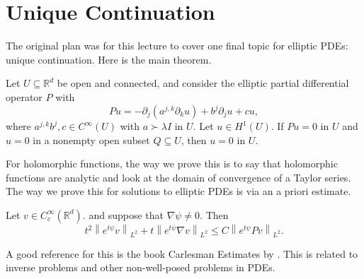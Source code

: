 \newpage
\section{Unique Continuation}
The original plan was for this lecture to cover one final topic for elliptic PDEs: unique continuation. Here is the main theorem. 


\begin{theorem}
[Aronszajn]
\label{thm: Aronszajn}
Let $U \subseteq \mathbb{R}^{d}$ be open and connected, and consider the elliptic partial differential operator $P$ with
$$
P u=-\partial_{j}\left(a^{j, k} \partial_{k} u\right)+b^{j} \partial_{j} u+c u,
$$
where $a^{j, k} b^{j}, c \in C^{\infty}(U)$ with $a \succ \lambda I$ in $U$. Let $u \in H^{1}(U)$. If $P u=0$ in $U$ and $u=0$ in a nonempty open subset $Q \subseteq U$, then $u=0$ in $U$.
\end{theorem}

For holomorphic functions, the way we prove this is to say that holomorphic functions are analytic and look at the domain of convergence of a Taylor series. The way we prove this for solutions to elliptic PDEs is via an a priori estimate. 


\begin{lemma}
\label{lem: Carleman estimate}
Let $v \in C_{c}^{\infty}\left(\mathbb{R}^{d}\right)$. and suppose that $\nabla \psi \neq 0$. Then
$$
t^{2}\left\|e^{t \psi} v\right\|_{L^{2}}+t\left\|e^{t \psi} \nabla v\right\|_{L^{2}} \leq C\left\|e^{t \psi} P v\right\|_{L^{2}} .
$$
\end{lemma}
A good reference for this is the book Carlesman Estimates by \cite{lerner2019carleman}. This is related to inverse problems and other non-well-posed problems in PDEs.

